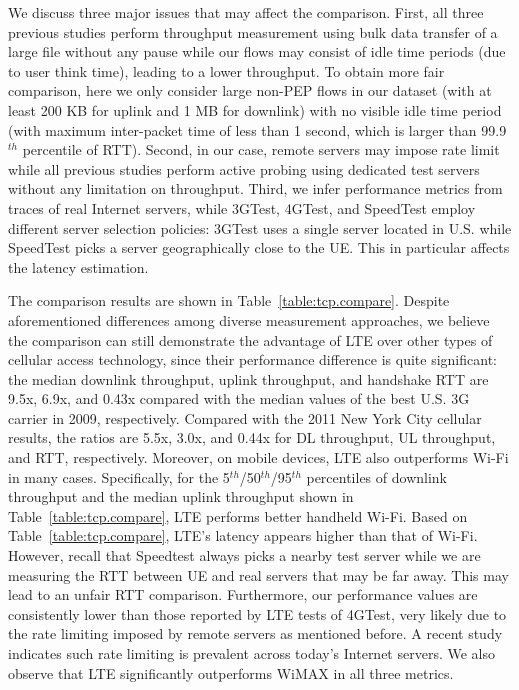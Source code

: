 We discuss three major issues that may affect the comparison. First, all three previous studies perform throughput measurement using bulk data transfer of a large file without any pause while our flows may consist of idle time periods (\eg due to user think time), leading to a lower throughput. To obtain more fair comparison, here we only consider large non-PEP flows in our dataset (with at least 200 KB for uplink and 1 MB for downlink) with no visible idle time period (with maximum inter-packet time of less than 1 second, which is larger than 99.9$^{th}$ percentile of RTT). Second, in our case, remote servers may impose rate limit~\cite{gerber10} while all previous studies perform active probing using dedicated test servers without any limitation on throughput. Third, we infer performance metrics from traces of real Internet servers, while 3GTest, 4GTest, and SpeedTest employ different server selection policies: 3GTest uses a single server located in U.S. while SpeedTest picks a server geographically close to the UE. This in particular affects the latency estimation.

The comparison results are shown in Table~\ref{table:tcp.compare}. Despite aforementioned differences among diverse measurement approaches, we believe the comparison can still demonstrate the advantage of LTE over other types of cellular access technology, since their performance difference is quite significant: the median downlink throughput, uplink throughput, and handshake RTT are 9.5x, 6.9x, and 0.43x compared with the median values of the best U.S. 3G carrier in 2009, respectively. Compared with the 2011 New York City cellular results, the ratios are 5.5x, 3.0x, and 0.44x for DL throughput, UL throughput, and RTT, respectively. Moreover, on mobile devices, LTE also outperforms Wi-Fi in many cases. Specifically, for the 5$^{th}$/50$^{th}$/95$^{th}$ percentiles of downlink throughput and the median uplink throughput shown in Table~\ref{table:tcp.compare}, LTE performs better handheld Wi-Fi. Based on Table~\ref{table:tcp.compare}, LTE's latency appears higher than that of Wi-Fi. However, recall that Speedtest always picks a nearby test server while we are measuring the RTT between UE and real servers that may be far away. This may lead to an unfair RTT comparison. Furthermore, our performance values are consistently lower than those reported by LTE tests of 4GTest, very likely due to the rate limiting imposed by remote servers as mentioned before. A recent study~\cite{gerber10} indicates such rate limiting is prevalent across today's Internet servers. We also observe that LTE significantly outperforms WiMAX in all three metrics.


